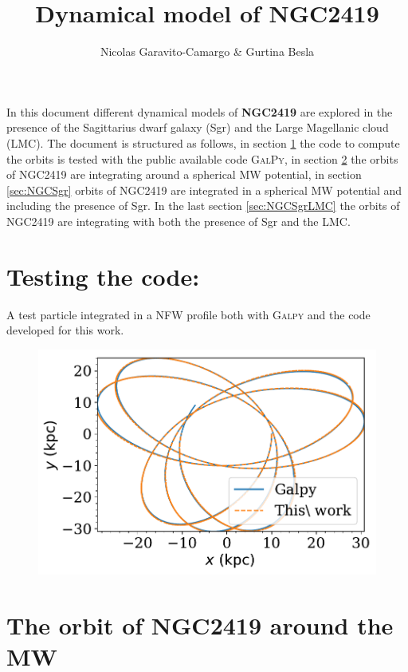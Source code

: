 \documentclass[14pt]{article}
\title{Dynamical model of NGC2419}
\author{Nicolas Garavito-Camargo \& Gurtina Besla}
\begin{document}
\maketitle


In this document different dynamical models of \textbf{NGC2419} are explored
in the presence of the Sagittarius dwarf galaxy (Sgr) and the Large
Magellanic cloud (LMC). The document is structured as follows, in section
\ref{sec:test} the code to compute the orbits is tested with the
public available code \textsc{GalPy}, in section \ref{sec:NGC} the
orbits of NGC2419 are integrating around a spherical MW potential,
in section \ref{sec:NGCSgr} orbits of NGC2419 are integrated in a
spherical MW potential and including the presence of Sgr.
 In the last section \ref{sec:NGCSgrLMC} the orbits of NGC2419 are integrating
with both the presence of Sgr and the LMC.

\section{Testing the code:}\label{sec:test}

A test particle integrated in a NFW profile both with \textsc{Galpy}
and the code developed for this work.

\begin{figure}[H]
\centering
\includegraphics[scale=0.5]{../exploratory_code/galpy_test.pdf}
\end{figure}


\section{The orbit of NGC2419 around the MW}\label{sec:NGC}
\end{document}
